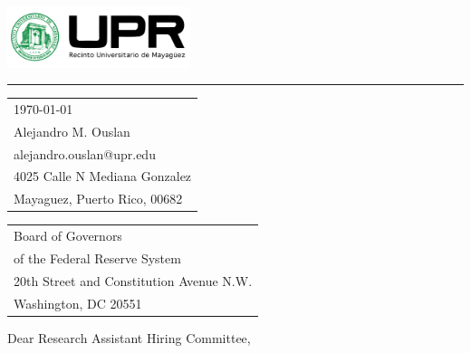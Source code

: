 \documentclass{article}
\begin{document}

\includegraphics[width=0.4\textwidth]{logo.png} %

\vspace{-1em} %

\rule{\linewidth}{1pt} %

\bigskip\bigskip %


\hfill
\begin{tabular}{l @{}}
\hfill \today \bigskip\\ %
\hfill Alejandro M. Ouslan \\
\hfill alejandro.ouslan@upr.edu \\
\hfill 4025 Calle N Mediana Gonzalez\\
\hfill Mayaguez, Puerto Rico, 00682 \\ %
\end{tabular}

\bigskip %


\begin{tabular}{@{} l}
Board of Governors \\
of the Federal Reserve System \\
20th Street and Constitution Avenue N.W. \\
Washington, DC 20551
\end{tabular}


\bigskip %

Dear Research Assistant Hiring Committee,

\bigskip %
\end{document}
